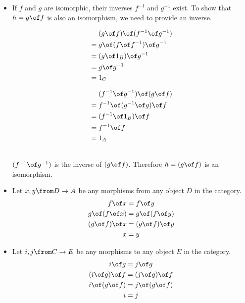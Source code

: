 \begin{answer}
    \begin{itemize}
  \item If $f$ and $g$ are isomorphic, their inverses
    $f^{-1}$ and $g^{-1}$ exist.
    To show that $h = g \of f$ is also an isomorphism,
    we need to provide an inverse.\\

    \begin{minipage}{.5\linewidth}
      \[
      \begin{aligned}
        & \ \ \ \ (g \of f) \of (f^{-1} \of g^{-1})\\
        &= g \of (f \of f^{-1}) \of g^{-1} \\
        &= (g \of 1_B) \of g^{-1} \\
        &= g \of g^{-1} \\
        &= 1_C
      \end{aligned}
      \]
    \end{minipage}%
    \begin{minipage}{.5\linewidth}
      \[
      \begin{aligned}
        & \ \ \ \ (f^{-1} \of g^{-1}) \of (g \of f)\\
        &= f^{-1} \of (g^{-1} \of g) \of f\\
        &= (f^{-1} \of 1_B) \of f\\
        &= f^{-1} \of f\\
        &= 1_A
      \end{aligned}
      \]
    \end{minipage}%
    \vspace{4mm}
    \\
    $(f^{-1} \of g^{-1})$ is the inverse of $(g \of f)$.
    Therefore $h = (g \of f)$ is an isomorphism.
    \vspace{5mm}
  \item
    \raggedright Let $x, y \from D \to A$ be any morphisms
    from any object $D$ in the category. \\
    \centering
      \[
      \begin{aligned}
        f \of x &= f \of y \\
        g \of (f \of x) &= g \of (f \of y) \\
        (g \of f) \of x &= (g \of f) \of y \\
        x &= y \\
      \end{aligned}
      \]
  \item
    \raggedright Let $i, j \from C \to E$ be any morphisms
    to any object $E$ in the category.\\
    \centering
      \[
      \begin{aligned}
        i \of g &= j \of g \\
        (i \of g) \of f &= (j \of g) \of f \\
        i \of (g \of f) &= j \of (g \of f) \\
        i &= j \\
      \end{aligned}
      \]
  \end{itemize}
\end{answer}

